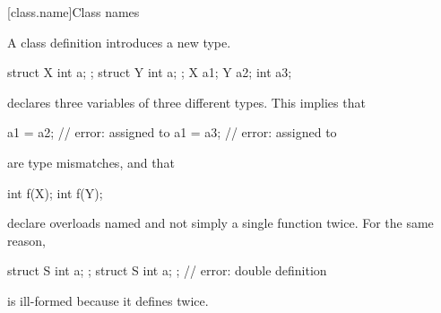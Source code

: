 [class.name]{Class names}
%
%
%

\pnum
A class definition introduces a new type.
\begin{example}
\begin{codeblock}
struct X { int a; };
struct Y { int a; };
X a1;
Y a2;
int a3;
\end{codeblock}
declares three variables of three different types. This implies that
\begin{codeblock}
a1 = a2;                        // error:  assigned to 
a1 = a3;                        // error:  assigned to 
\end{codeblock}
are type mismatches, and that
\begin{codeblock}
int f(X);
int f(Y);
\end{codeblock}
%
declare overloads named  and not
simply a single function  twice. For the same reason,
\begin{codeblock}
struct S { int a; };
struct S { int a; };            // error: double definition
\end{codeblock}
is ill-formed because it defines  twice.
\end{example}

